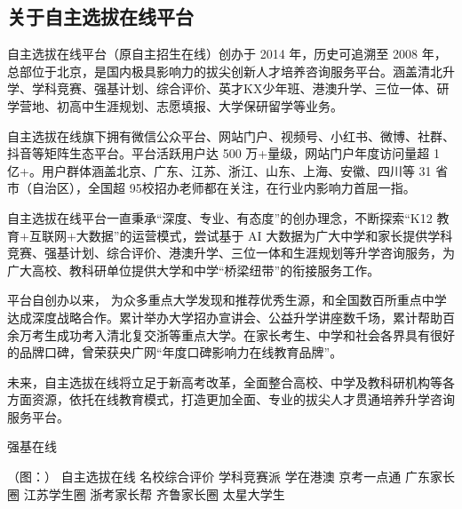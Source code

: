 \subsection*{关于自主选拔在线平台}

自主选拔在线平台（原自主招生在线）创办于 2014 年，历史可追溯至 2008 年，总部位于北京，是国内极具影响力的拔尖创新人才培养咨询服务平台。涵盖清北升学、学科竞赛、强基计划、综合评价、英才KX少年班、港澳升学、三位一体、研学营地、初高中生涯规划、志愿填报、大学保研留学等业务。

自主选拔在线旗下拥有微信公众平台、网站门户、视频号、小红书、微博、社群、抖音等矩阵生态平台。平台活跃用户达 500 万+量级，网站门户年度访问量超 1 亿+。用户群体涵盖北京、广东、江苏、浙江、山东、上海、安徽、四川等 31 省市（自治区），全国超 95校招办老师都在关注，在行业内影响力首屈一指。

自主选拔在线平台一直秉承“深度、专业、有态度”的创办理念，不断探索“K12 教育+互联网+大数据”的运营模式，尝试基于 AI 大数据为广大中学和家长提供学科竞赛、强基计划、综合评价、港澳升学、三位一体和生涯规划等升学咨询服务，为广大高校、教科研单位提供大学和中学“桥梁纽带”的衔接服务工作。

平台自创办以来， 为众多重点大学发现和推荐优秀生源，和全国数百所重点中学达成深度战略合作。累计举办大学招办宣讲会、公益升学讲座数千场，累计帮助百余万考生成功考入清北复交浙等重点大学。在家长考生、中学和社会各界具有很好的品牌口碑，曾荣获央广网“年度口碑影响力在线教育品牌”。

未来，自主选拔在线将立足于新高考改革，全面整合高校、中学及教科研机构等各方面资源，依托在线教育模式，打造更加全面、专业的拔尖人才贯通培养升学咨询服务平台。

强基在线

（图：）
自主选拔在线
名校综合评价
学科竞赛派
学在港澳
京考一点通
广东家长圈
江苏学生圈
浙考家长帮
齐鲁家长圈
太星大学生
